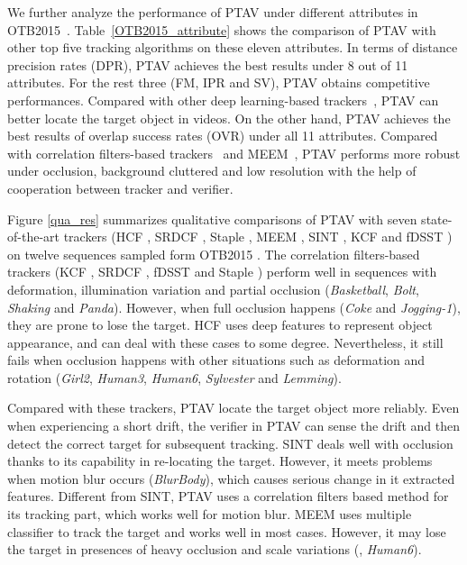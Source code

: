 \documentclass[10pt,twocolumn,letterpaper]{article}
\begin{document}
 We further analyze the performance of PTAV under different attributes in OTB2015~\cite{wu2015object}. Table~\ref{OTB2015_attribute} shows the comparison of PTAV with other top five tracking algorithms on these eleven attributes. In terms of distance precision rates (DPR), PTAV achieves the best results under 8 out of 11 attributes. For the rest three (FM, IPR and SV), PTAV obtains competitive performances. Compared with other deep learning-based trackers~\cite{ma2015hierarchical,tao2016siamese}, PTAV can better locate the target object in videos. On the other hand, PTAV achieves the best results of overlap success rates (OVR) under all 11 attributes. Compared with correlation filters-based trackers~\cite{danelljan2015learning,bertinetto2016staple} and MEEM~\cite{zhang2014meem}, PTAV performs more robust under occlusion, background cluttered and low resolution with the help of cooperation between tracker and verifier.

 Figure \ref{qua_res} summarizes qualitative comparisons of PTAV with seven state-of-the-art trackers (HCF \cite{ma2015hierarchical}, SRDCF \cite{danelljan2015learning}, Staple \cite{bertinetto2016staple}, MEEM \cite{zhang2014meem}, SINT \cite{tao2016siamese}, KCF \cite{henriques2012exploiting} and fDSST \cite{danelljan2016discriminative}) on twelve sequences sampled form OTB2015 \cite{wu2015object}. The correlation filters-based trackers (KCF \cite{henriques2015high}, SRDCF \cite{danelljan2015learning}, fDSST \cite{danelljan2016discriminative} and Staple \cite{bertinetto2016staple}) perform well in sequences with deformation, illumination variation and partial occlusion ({\it Basketball}, {\it Bolt}, {\it Shaking} and {\it Panda}). However, when full occlusion happens ({\it Coke} and {\it Jogging-1}), they are prone to lose the target. HCF \cite{ma2015hierarchical} uses deep features to represent object appearance, and can deal with these cases to some degree. Nevertheless, it still fails when occlusion happens with other situations such as deformation and rotation ({\it Girl2}, {\it Human3}, {\it Human6}, {\it Sylvester} and {\it Lemming}).

Compared with these trackers, PTAV locate the target object more reliably. Even when experiencing a short drift, the verifier in PTAV can sense the drift and then detect the correct target for subsequent tracking. SINT \cite{tao2016siamese} deals well with occlusion thanks to its capability in re-locating the target. However, it meets problems when motion blur occurs ({\it BlurBody}), which causes serious change in it extracted features. Different from SINT, PTAV uses a correlation filters based method for its tracking part, which works well for motion blur. MEEM \cite{zhang2014meem} uses multiple classifier to track the target and works well in most cases. However, it may lose the target in presences of heavy occlusion and scale variations (\eg, {\it Human6}).
\end{document}
